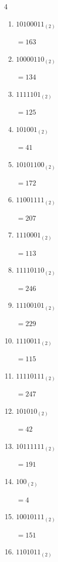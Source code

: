 \begin{multicols}{4}
\begin{enumerate}
        $=54$

  \item $10100011_{(2)}$

        $=163$

  \item $10000110_{(2)}$

        $=134$

  \item $1111101_{(2)}$

        $=125$

  \item $101001_{(2)}$

        $=41$

\columnbreak %

  \item $10101100_{(2)}$

        $=172$

  \item $11001111_{(2)}$

        $=207$

  \item $1110001_{(2)}$

        $=113$

  \item $11110110_{(2)}$

        $=246$

  \item $11100101_{(2)}$

        $=229$

  \item $1110011_{(2)}$

        $=115$

  \item $11110111_{(2)}$

        $=247$

  \item $101010_{(2)}$

        $=42$

  \item $10111111_{(2)}$

        $=191$

  \item $100_{(2)}$

        $=4$

  \item $10010111_{(2)}$

        $=151$

  \item $1101011_{(2)}$


\end{enumerate}
\end{multicols}
